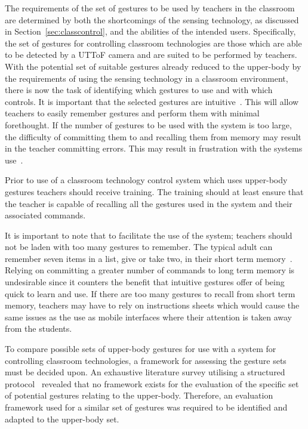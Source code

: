 \documentclass[manuscript, review, screen]{acmart}
\begin{document}
The requirements of the set of gestures to be used by teachers in the classroom are determined by both the shortcomings of the sensing technology, as discussed in Section~\ref{sec:classcontrol}, and the abilities of the intended users.
Specifically, the set of gestures for controlling classroom technologies are those which are able to be detected by a \ac{UTToF} camera and are suited to be performed by teachers.
With the potential set of suitable gestures already reduced to the upper-body by the requirements of using the sensing technology in a classroom environment, there is now the task of identifying which gestures to use and with which controls.
It is important that the selected gestures are intuitive~\cite{Cohen,Wachs2011}.
This will allow teachers to easily remember gestures and perform them with minimal forethought.
If the number of gestures to be used with the system is too large, the difficulty of committing them to and recalling them from memory may result in the teacher committing errors.
This may result in frustration with the systems use~\cite{Mendoza2005}.

Prior to use of a classroom technology control system which uses upper-body gestures teachers should receive training.
The training should at least ensure that the teacher is capable of recalling all the gestures used in the system and their associated commands.

It is important to note that to facilitate the use of the system; teachers should not be laden with too many gestures to remember.
The typical adult can remember seven items in a list, give or take two, in their short term memory~\cite{mil56}.
Relying on committing a greater number of commands to long term memory is undesirable since it counters the benefit that intuitive gestures offer of being quick to learn and use.
If there are too many gestures to recall from short term memory, teachers may have to rely on instructions sheets which would cause the same issues as the use as mobile interfaces where their attention is taken away from the students.

To compare possible sets of upper-body gestures for use with a system for controlling classroom technologies, a framework for assessing the gesture sets must be decided upon.
An exhaustive literature survey utilising a structured protocol~\cite{kitchenham04} revealed that no framework exists for the evaluation of the specific set of potential gestures relating to the upper-body.
Therefore, an evaluation framework used for a similar set of gestures was required to be identified and adapted to the upper-body set.
\end{document}
